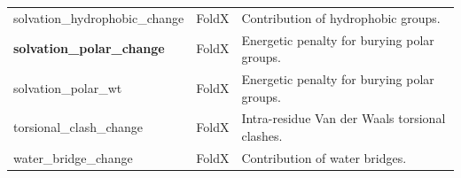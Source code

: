 \begin{table}[tb]
\begin{tabular}{ l | l | p{8cm} }
		solvation\_hydrophobic\_change        & FoldX          & Contribution of hydrophobic groups.                                                                 \\
		\textbf{solvation\_polar\_change}     & FoldX          & Energetic penalty for burying polar groups.                                                         \\
		solvation\_polar\_wt                  & FoldX          & Energetic penalty for burying polar groups.                                                         \\
		torsional\_clash\_change              & FoldX          & Intra-residue Van der Waals torsional clashes.                                                      \\
		water\_bridge\_change                 & FoldX          & Contribution of water bridges.                                                                      \\
		\bottomrule
	\end{tabular}
\end{table}



\clearpage

